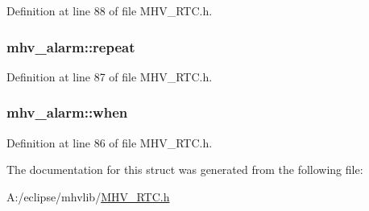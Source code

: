 Definition at line 88 of file M\-H\-V\-\_\-\-R\-T\-C.\-h.

\hypertarget{structmhv__alarm_ad8195c11cd5d6ff3bb37d01185c04af2}{
\subsubsection[{repeat}]{ mhv\-\_\-alarm\-::repeat}}\label{structmhv__alarm_ad8195c11cd5d6ff3bb37d01185c04af2}


Definition at line 87 of file M\-H\-V\-\_\-\-R\-T\-C.\-h.

\hypertarget{structmhv__alarm_acbab8b3b4efa4d891d598cbd5b47fb7c}{
\subsubsection[{when}]{ mhv\-\_\-alarm\-::when}}\label{structmhv__alarm_acbab8b3b4efa4d891d598cbd5b47fb7c}


Definition at line 86 of file M\-H\-V\-\_\-\-R\-T\-C.\-h.



The documentation for this struct was generated from the following file\-:\begin{DoxyCompactItemize}
\item 
A\-:/eclipse/mhvlib/\hyperlink{_m_h_v___r_t_c_8h}{M\-H\-V\-\_\-\-R\-T\-C.\-h}\end{DoxyCompactItemize}
